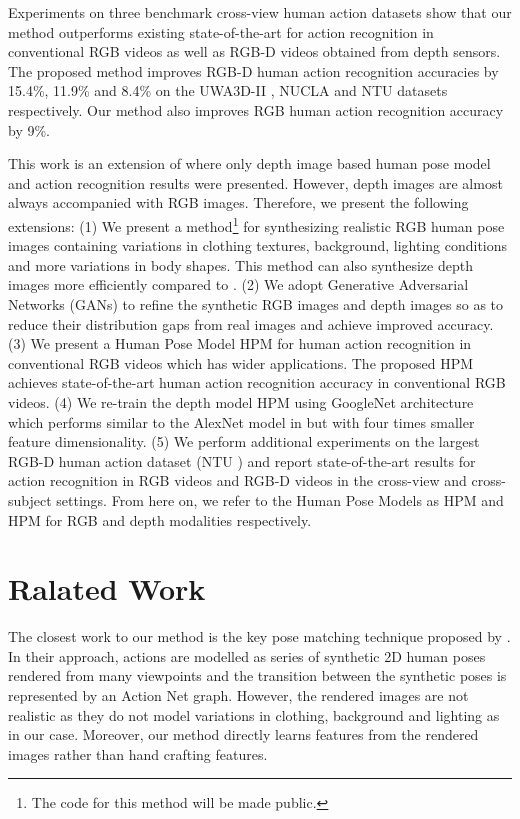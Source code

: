 \documentclass[twocolumn]{svjour3}          \smartqed  \usepackage{graphicx}
\begin{document}
Experiments on three benchmark cross-view human action datasets show that our method outperforms existing state-of-the-art for action recognition in conventional RGB videos as well as RGB-D videos obtained from depth sensors. The proposed method improves RGB-D human action recognition accuracies by 15.4\%, 11.9\% and 8.4\% on the UWA3D-II \citep{HOPC2016PAMI}, NUCLA \citep{AOG} and NTU \citep{shahroudy2016ntu} datasets respectively. Our method also improves RGB human action recognition accuracy by 9\%.

This work is an extension of \citep{HPM+TM} where only depth image based human pose model and action recognition results were presented. However, depth images are almost always accompanied with RGB images. Therefore, we present the following extensions: (1) We present a method\footnote{The code for this method will be made public.} for synthesizing realistic RGB human pose images containing variations in clothing textures, background, lighting conditions and more variations in body shapes. This method can also synthesize depth images more efficiently compared to \citep{HPM+TM}. (2) We adopt Generative Adversarial Networks (GANs) to refine the synthetic RGB images and depth images so as to reduce their distribution gaps from real images and achieve improved accuracy. (3) We present a Human Pose Model HPM for human action recognition in conventional RGB videos which has wider applications. The proposed HPM achieves state-of-the-art human action recognition accuracy in conventional RGB videos. (4) We re-train the depth model HPM using GoogleNet \citep{GoogLeNet} architecture which performs similar to the AlexNet \citep{AlexNet} model in \citep{HPM+TM} but with four times smaller feature dimensionality. (5) We perform additional experiments on the largest RGB-D human action dataset (NTU \citep{shahroudy2016ntu}) and report state-of-the-art results for action recognition in RGB videos and RGB-D videos in the cross-view and cross-subject settings. From here on, we refer to the Human Pose Models as HPM and HPM for RGB and depth modalities respectively.



\section{Ralated Work}
The closest work to our method is the key pose matching technique proposed by \citet{lv2007single}. In their approach, actions are modelled as series of synthetic 2D human poses rendered from many viewpoints and the transition between the synthetic poses is represented by an Action Net graph. However, the rendered images are not realistic as they do not model variations in clothing, background and lighting as in our case. Moreover, our method directly learns features from the rendered images rather than hand crafting features.
\end{document}
